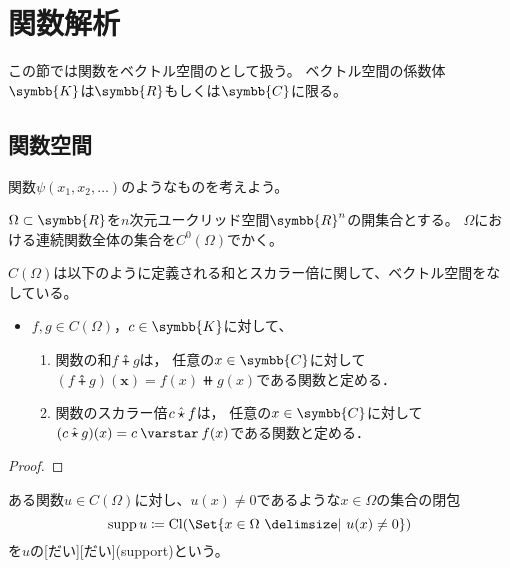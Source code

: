 \documentclass[../sotsu.tex]{subfiles}
\begin{document}
\section{関数解析}

この節では関数をベクトル空間のとして扱う。
ベクトル空間の係数体$\symbb{K}$は$\symbb{R}$もしくは$\symbb{C}$に限る。

\subsection{関数空間}

関数$\psi(x_1, x_2, \dotsc)$のようなものを考えよう。

\begin{definition}
    $\Omega \subset \symbb{R}$を$n$次元ユークリッド空間$\symbb{R}^n$の開集合とする。
    $\Omega$における連続関数全体の集合を$C^0 (\Omega)$でかく。
\end{definition}

\begin{proposition}
    \label{thm:continuous-function-space-is-vector-space}
    $C(\Omega)$は以下のように定義される和とスカラー倍に関して、ベクトル空間をなしている。
    \begin{itemize}
        \item $f, g \in C(\Omega)$，$c \in \symbb{K}$に対して、
        \begin{enumerate}
            \item 関数の和$f \plushat g$は，
                任意の$x \in \symbb{C}$に対して$ ( f \plushat g )(\symbf{x}) = f(x) \doubleplus g(x) $である関数と定める．
            \item 関数のスカラー倍$c \mathbin{\hat{\mathbin{\star}}} f$は，
                任意の$x \in \symbb{C}$に対して$ ( c \mathbin{\hat{\scaprod}} g )(x) = c \scaprodvar f(x) $である関数と定める．
        \end{enumerate}
    \end{itemize}
\end{proposition}

\begin{proof}
    
\end{proof}


\begin{definition}
    ある関数$u \in C(\Omega)$に対し、$u(x) \neq 0$であるような$x \in \Omega$の集合の閉包
    \begin{equation}
        \supp u  \coloneq  \cl{ \Set{  x \in \Omega  \given  u(x) \neq 0  } }
    \end{equation}
    を$u$の[だい][だい](support)という。
\end{definition}
\end{document}

